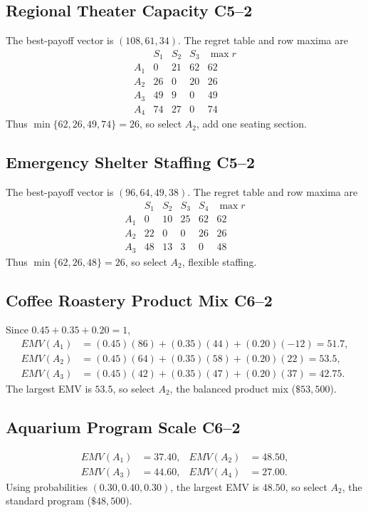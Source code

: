 \subsection{Regional Theater Capacity \hfill C5--2}
The best-payoff vector is $(108,61,34)$. The regret table and row maxima are
\[\begin{array}{c|ccc|c}&S_1&S_2&S_3&\max r\\ \hline A_1&0&21&62&62\\ A_2&26&0&20&26\\ A_3&49&9&0&49\\ A_4&74&27&0&74\end{array}\]
Thus $\min\{62,26,49,74\}=26$, so select $\boxed{A_2}$, add one seating section.

\subsection{Emergency Shelter Staffing \hfill C5--2}
The best-payoff vector is $(96,64,49,38)$. The regret table and row maxima are
\[\begin{array}{c|cccc|c}&S_1&S_2&S_3&S_4&\max r\\ \hline A_1&0&10&25&62&62\\ A_2&22&0&0&26&26\\ A_3&48&13&3&0&48\end{array}\]
Thus $\min\{62,26,48\}=26$, so select $\boxed{A_2}$, flexible staffing.

\subsection{Coffee Roastery Product Mix \hfill C6--2}
Since $0.45+0.35+0.20=1$,
\begin{align*}
EMV(A_1)&=(0.45)(86)+(0.35)(44)+(0.20)(-12)=51.7,\\
EMV(A_2)&=(0.45)(64)+(0.35)(58)+(0.20)(22)=53.5,\\
EMV(A_3)&=(0.45)(42)+(0.35)(47)+(0.20)(37)=42.75.
\end{align*}
The largest EMV is $53.5$, so select $\boxed{A_2}$, the balanced product mix ($\$53{,}500$).

\subsection{Aquarium Program Scale \hfill C6--2}
\begin{align*}EMV(A_1)&=37.40,&EMV(A_2)&=48.50,\\ EMV(A_3)&=44.60,&EMV(A_4)&=27.00.\end{align*}
Using probabilities $(0.30,0.40,0.30)$, the largest EMV is $48.50$, so select $\boxed{A_2}$, the standard program ($\$48{,}500$).

